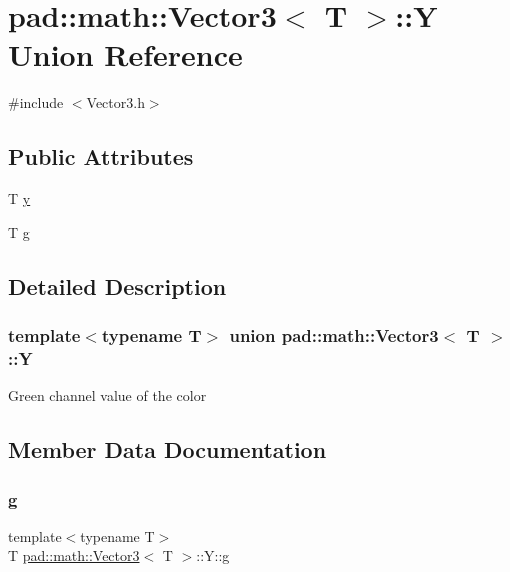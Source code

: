 \hypertarget{unionpad_1_1math_1_1_vector3_1_1_y}{}\section{pad\+:\+:math\+:\+:Vector3$<$ T $>$\+:\+:Y Union Reference}
\label{unionpad_1_1math_1_1_vector3_1_1_y}


{\ttfamily \#include $<$Vector3.\+h$>$}

\subsection*{Public Attributes}
\begin{DoxyCompactItemize}
\item 
T \mbox{\hyperlink{unionpad_1_1math_1_1_vector3_1_1_y_a7226429e99afe23bdb947736bfeb93fa}{y}}
\item 
T \mbox{\hyperlink{unionpad_1_1math_1_1_vector3_1_1_y_a27207726e554ecaa5c7b9c9f617eaccd}{g}}
\end{DoxyCompactItemize}


\subsection{Detailed Description}
\subsubsection*{template$<$typename T$>$\newline
union pad\+::math\+::\+Vector3$<$ T $>$\+::Y}

Green channel value of the color 

\subsection{Member Data Documentation}
\mbox{\label{unionpad_1_1math_1_1_vector3_1_1_y_a27207726e554ecaa5c7b9c9f617eaccd}} 
\subsubsection{\texorpdfstring{g}{g}}
{\footnotesize\ttfamily template$<$typename T$>$ \\
T \mbox{\hyperlink{structpad_1_1math_1_1_vector3}{pad\+::math\+::\+Vector3}}$<$ T $>$\+::Y\+::g}

